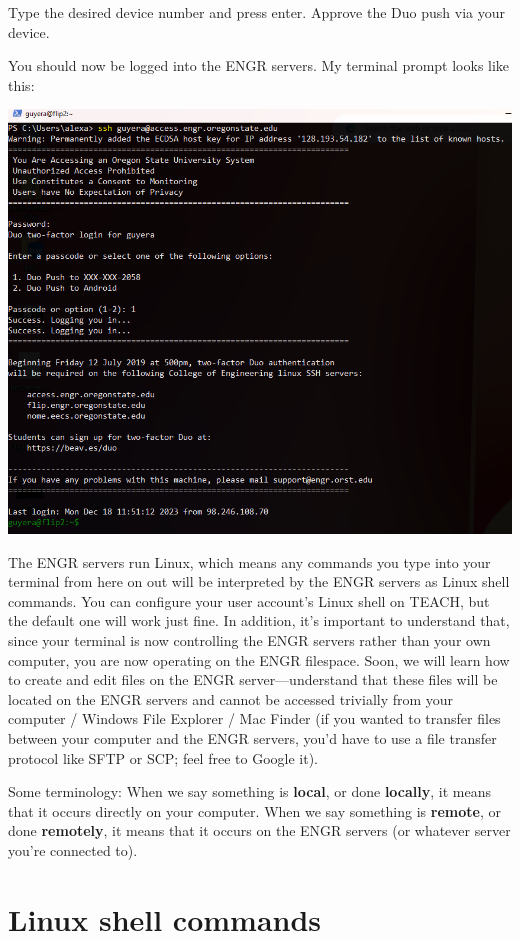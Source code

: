\documentclass{article}
\makeatletter
\def\maxwidth#1{\ifdim\Gin@nat@width>#1 #1\else\Gin@nat@width\fi}
\makeatother
\begin{document}
Type the desired device number and press enter. Approve the Duo push via your device.

You should now be logged into the ENGR servers. My terminal prompt looks like this:

\includegraphics[width=\maxwidth{0.95\columnwidth}]{res/login.PNG}

The ENGR servers run Linux, which means any commands you type into your terminal from here on out will be interpreted by the ENGR servers as Linux shell commands. You can configure your user account's Linux shell on TEACH, but the default one will work just fine. In addition, it's important to understand that, since your terminal is now controlling the ENGR servers rather than your own computer, you are now operating on the ENGR filespace. Soon, we will learn how to create and edit files on the ENGR server---understand that these files will be located on the ENGR servers and cannot be accessed trivially from your computer / Windows File Explorer / Mac Finder (if you wanted to transfer files between your computer and the ENGR servers, you'd have to use a file transfer protocol like SFTP or SCP; feel free to Google it).

Some terminology: When we say something is \textbf{local}, or done \textbf{locally}, it means that it occurs directly on your computer. When we say something is \textbf{remote}, or done \textbf{remotely}, it means that it occurs on the ENGR servers (or whatever server you're connected to).

\section{Linux shell commands}
\end{document}
